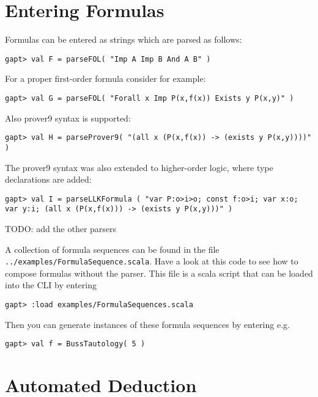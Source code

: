 \documentclass[a4paper,11pt]{article}
\newcommand{\cli}[1]{{\tt {#1}}}
\begin{document}
\section{Entering Formulas}\label{sec.entering_formulas}

Formulas can be entered as strings which are parsed as follows:
%
\begin{lstlisting}
gapt> val F = parseFOL( "Imp A Imp B And A B" )
\end{lstlisting}
%
For a proper first-order formula consider for example:
%
\begin{lstlisting}
gapt> val G = parseFOL( "Forall x Imp P(x,f(x)) Exists y P(x,y)" )
\end{lstlisting}
%
Also prover9 syntax\cite{Prover9Input} is supported: 
%
\begin{lstlisting}
gapt> val H = parseProver9( "(all x (P(x,f(x)) -> (exists y P(x,y))))" )
\end{lstlisting}
%
The prover9 syntax was also extended to higher-order logic, where type declarations are added:
%
\begin{lstlisting}
gapt> val I = parseLLKFormula ( "var P:o>i>o; const f:o>i; var x:o; var y:i; (all x (P(x,f(x))) -> (exists y P(x,y)))" )
\end{lstlisting}

\begin{meta}
TODO: add the other parsers
\end{meta}

A collection of formula sequences can be found in the file \cli{../examples/FormulaSequence.scala}.
Have a look at this code to see how to compose formulas without the parser. This file is
a scala script that can be loaded into the CLI by entering
%
\begin{lstlisting}
gapt> :load examples/FormulaSequences.scala
\end{lstlisting}
%
Then you can generate instances of these formula sequences by entering e.g.
%
\begin{lstlisting}
gapt> val f = BussTautology( 5 )
\end{lstlisting}



\section{Automated Deduction}
  
\end{document}
